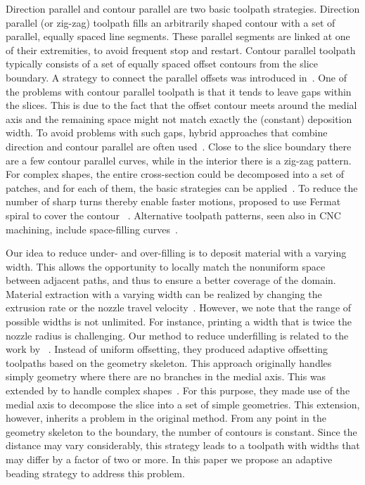 Direction parallel and contour parallel are two basic toolpath strategies.
Direction parallel (or zig-zag) toolpath fills an arbitrarily shaped contour with a set of parallel, equally spaced line segments.
These parallel segments are linked at one of their extremities, to avoid frequent stop and restart.
Contour parallel toolpath typically consists of a set of equally spaced offset contours from the slice boundary.
A strategy to connect the parallel offsets was introduced in~\cite{KUIPERS2019CAD}.
One of the problems with contour parallel toolpath is that it tends to leave gaps within the slices.
This is due to the fact that the offset contour meets around the medial axis and the remaining space might not match exactly the (constant) deposition width.
To avoid problems with such gaps, hybrid approaches that combine direction and contour parallel are often used~\cite{Mcmains2000DETC,Jin2013adaptive}.
Close to the slice boundary there are a few contour parallel curves, while in the interior there is a zig-zag pattern.
For complex shapes, the entire cross-section could be decomposed into a set of patches, and for each of them, the basic strategies can be applied~\cite{Ding2014}.
To reduce the number of sharp turns thereby enable faster motions, \citeauthor{Zhao2016} proposed to use Fermat spiral to cover the contour ~\cite{Zhao2016}.
Alternative toolpath patterns, seen also in CNC machining, include space-filling curves~\cite{Cox1994CAD,Griffiths1994,Shaikh2016}.

Our idea to reduce under- and over-filling is to deposit material with a varying width.
This allows the opportunity to locally match the nonuniform space between adjacent paths, and thus to ensure a better coverage of the domain.
Material extraction with a varying width can be realized by changing the extrusion rate or the nozzle travel velocity~\cite{Ertay2018}.
However, we note that the range of possible widths is not unlimited.
For instance, printing a width that is twice the nozzle radius is challenging.
Our method to reduce underfilling is related to the work by \citeauthor{kao1998optimal}~\cite{kao1998optimal}.
Instead of uniform offsetting, they produced adaptive offsetting toolpaths based on the geometry skeleton.
This approach originally handles simply geometry where there are no branches in the medial axis.
This was extended by \citeauthor{Ding2016a} to handle complex shapes~\cite{Ding2016a}.
For this purpose, they made use of the medial axis to decompose the slice into a set of simple geometries.
This extension, however, inherits a problem in the original method.
From any point in the geometry skeleton to the boundary, the number of contours is constant.
Since the distance may vary considerably, this strategy leads to a toolpath with widths that may differ by a factor of two or more.
In this paper we propose an adaptive beading strategy to address this problem.

